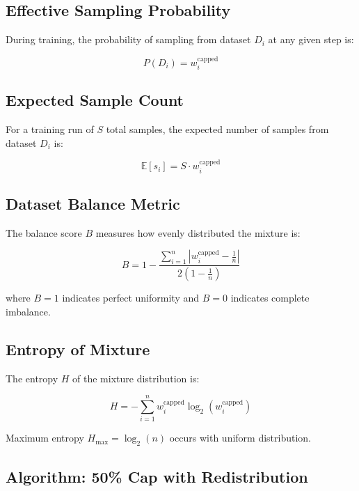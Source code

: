 \documentclass{article}
\begin{document}
\subsection{Effective Sampling Probability}

During training, the probability of sampling from dataset $D_i$ at any given step is:

\begin{equation}
P(D_i) = w_i^{\text{capped}}
\end{equation}

\subsection{Expected Sample Count}

For a training run of $S$ total samples, the expected number of samples from dataset $D_i$ is:

\begin{equation}
\mathbb{E}[s_i] = S \cdot w_i^{\text{capped}}
\end{equation}

\subsection{Dataset Balance Metric}

The balance score $B$ measures how evenly distributed the mixture is:

\begin{equation}
B = 1 - \frac{\sum_{i=1}^{n} |w_i^{\text{capped}} - \frac{1}{n}|}{2(1 - \frac{1}{n})}
\end{equation}

where $B = 1$ indicates perfect uniformity and $B = 0$ indicates complete imbalance.

\subsection{Entropy of Mixture}

The entropy $H$ of the mixture distribution is:

\begin{equation}
H = -\sum_{i=1}^{n} w_i^{\text{capped}} \log_2(w_i^{\text{capped}})
\end{equation}

Maximum entropy $H_{\max} = \log_2(n)$ occurs with uniform distribution.

\subsection{Algorithm: 50\% Cap with Redistribution}
\end{document}
